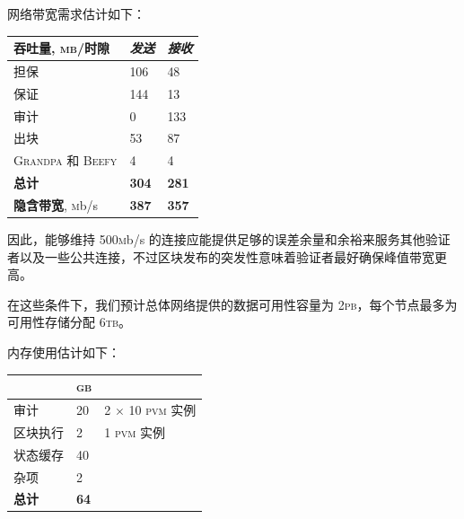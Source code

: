 网络带宽需求估计如下：
\begin{center}
\begin{tabular}[h]{@{}lll@{}}
  \toprule
  吞吐量, \textsc{mb}/时隙 & \emph{发送} & \emph{接收} \\
  \midrule
  担保 & 106 & 48 \\
  保证 & 144 & 13 \\
  审计 & 0 & 133 \\
  出块 & 53 & 87 \\
  \textsc{Grandpa} 和 \textsc{Beefy} & 4 & 4 \\
  \textbf{总计} & \textbf{304} & \textbf{281} \\
  \midrule
  \textbf{隐含带宽}, \textsc{m}b/s & \textbf{387} & \textbf{357} \\
  \bottomrule
\end{tabular}
\end{center}

因此，能够维持 500\textsc{m}b/s 的连接应能提供足够的误差余量和余裕来服务其他验证者以及一些公共连接，不过区块发布的突发性意味着验证者最好确保峰值带宽更高。

在这些条件下，我们预计总体网络提供的数据可用性容量为 2\textsc{pb}，每个节点最多为可用性存储分配 $6$\textsc{tb}。

内存使用估计如下：

\begin{center}
  \begin{tabular}[h]{@{}lll@{}}
    \toprule
    & \textsc{gb} \\
    \midrule
    审计 & 20 & 2 $\times$ 10 \textsc{pvm} 实例 \\
    区块执行 & 2 & 1 \textsc{pvm} 实例 \\
    状态缓存 & 40 & \\
    杂项 & 2 & \\
    \textbf{总计} & \textbf{64} & \\
    \bottomrule
  \end{tabular}
\end{center}


